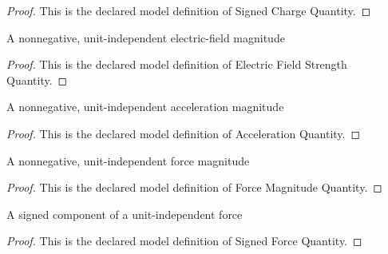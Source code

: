 \begin{proof}
  This is the declared model definition of Signed Charge Quantity.
\end{proof}
\begin{definition}
  \label{def:physics:phyx-mini-0904:phyxminiproblems-problemphyxmini0904-electricfieldstrengthquantity}
  A nonnegative, unit-independent electric-field magnitude
\end{definition}
\begin{proof}
  This is the declared model definition of Electric Field Strength Quantity.
\end{proof}
\begin{definition}
  \label{def:physics:phyx-mini-0904:phyxminiproblems-problemphyxmini0904-accelerationquantity}
  A nonnegative, unit-independent acceleration magnitude
\end{definition}
\begin{proof}
  This is the declared model definition of Acceleration Quantity.
\end{proof}
\begin{definition}
  \label{def:physics:phyx-mini-0904:phyxminiproblems-problemphyxmini0904-forcemagnitudequantity}
  A nonnegative, unit-independent force magnitude
\end{definition}
\begin{proof}
  This is the declared model definition of Force Magnitude Quantity.
\end{proof}
\begin{definition}
  \label{def:physics:phyx-mini-0904:phyxminiproblems-problemphyxmini0904-signedforcequantity}
  A signed component of a unit-independent force
\end{definition}
\begin{proof}
  This is the declared model definition of Signed Force Quantity.
\end{proof}
